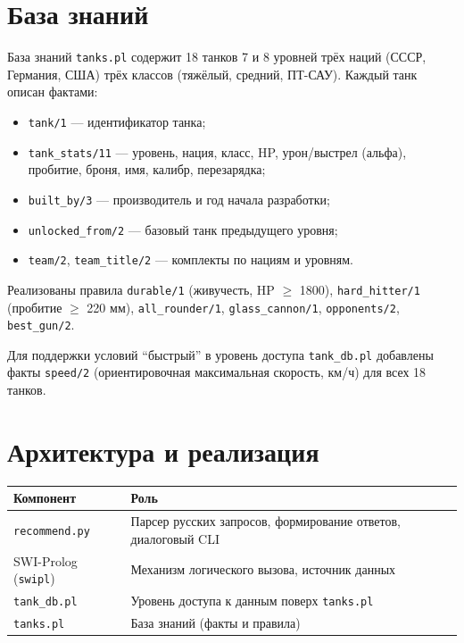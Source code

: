 \documentclass[12pt,a4paper]{article}
\begin{document}
\section*{База знаний}

База знаний \texttt{tanks.pl} содержит 18 танков 7 и 8 уровней трёх наций (СССР, Германия, США) трёх классов (тяжёлый, средний, ПТ-САУ). Каждый танк описан фактами:
\begin{itemize}
\item \texttt{tank/1} --- идентификатор танка;
\item \texttt{tank\_stats/11} --- уровень, нация, класс, HP, урон/выстрел (альфа), пробитие, броня, имя, калибр, перезарядка;
\item \texttt{built\_by/3} --- производитель и год начала разработки;
\item \texttt{unlocked\_from/2} --- базовый танк предыдущего уровня;
\item \texttt{team/2}, \texttt{team\_title/2} --- комплекты по нациям и уровням.
\end{itemize}

Реализованы правила \texttt{durable/1} (живучесть, HP $\ge$ 1800), \texttt{hard\_hitter/1} (пробитие $\ge$ 220 мм), \texttt{all\_rounder/1}, \texttt{glass\_cannon/1}, \texttt{opponents/2}, \texttt{best\_gun/2}.

Для поддержки условий ``быстрый'' в уровень доступа \texttt{tank\_db.pl} добавлены факты \texttt{speed/2} (ориентировочная максимальная скорость, км/ч) для всех 18 танков.

\section*{Архитектура и реализация}

\begin{center}
\begin{tabular}{ll}
\toprule
Компонент & Роль \\
\midrule
\texttt{recommend.py} & Парсер русских запросов, формирование ответов, диалоговый CLI \\
SWI-Prolog (\texttt{swipl}) & Механизм логического вызова, источник данных \\
\texttt{tank\_db.pl} & Уровень доступа к данным поверх \texttt{tanks.pl} \\
\texttt{tanks.pl} & База знаний (факты и правила) \\
\bottomrule
\end{tabular}
\end{center}
\end{document}
